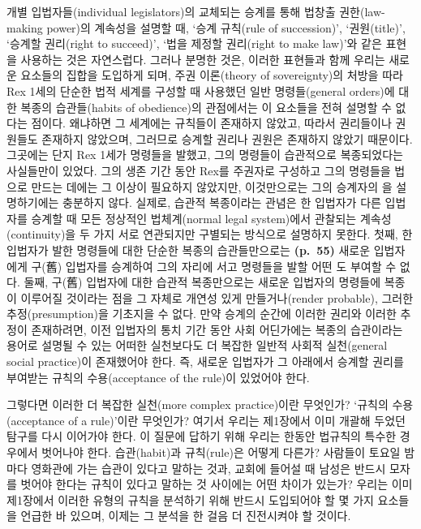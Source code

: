 개별 입법자들(individual legislators)의 교체되는 승계를 통해 법창출
권한(law-making power)의 계속성을 설명할 때, ‘승계 규칙(rule of
succession)’, ‘권원(title)’, ‘승계할 권리(right to succeed)’, ‘법을
제정할 권리(right to make law)’와 같은 표현을 사용하는 것은 자연스럽다.
그러나 분명한 것은, 이러한 표현들과 함께 우리는 새로운 요소들의 집합을
도입하게 되며, 주권 이론(theory of sovereignty)의 처방을 따라 Rex 1세의
단순한 법적 세계를 구성할 때 사용했던 일반 명령들(general orders)에 대한
복종의 습관들(habits of obedience)의 관점에서는 이 요소들을 전혀 설명할
수 없다는 점이다. 왜냐하면 그 세계에는 규칙들이 존재하지 않았고, 따라서
권리들이나 권원들도 존재하지 않았으며, 그러므로  승계할 권리나 권원은 존재하지 않았기 때문이다. 그곳에는 단지
Rex 1세가 명령들을 발했고, 그의 명령들이 습관적으로 복종되었다는
사실들만이 있었다. 그의 생존 기간 동안 Rex를 주권자로 구성하고 그의
명령들을 법으로 만드는 데에는 그 이상이 필요하지 않았지만, 이것만으로는
그의 승계자의 을 설명하기에는 충분하지 않다.
실제로, 습관적 복종이라는 관념은 한 입법자가 다른 입법자를 승계할 때
모든 정상적인 법체계(normal legal system)에서 관찰되는
계속성(continuity)을 두 가지 서로 연관되지만 구별되는 방식으로 설명하지
못한다. 첫째, 한 입법자가 발한 명령들에 대한 단순한 복종의
습관들만으로는 \textbf{(p.~55)} 새로운 입법자에게 구(舊) 입법자를
승계하여 그의 자리에 서고 명령들을 발할 어떤 도 부여할
수 없다. 둘째, 구(舊) 입법자에 대한 습관적 복종만으로는 새로운 입법자의
명령들에 복종이 이루어질 것이라는 점을 그 자체로 개연성 있게
만들거나(render probable), 그러한 추정(presumption)을 기초지을 수 없다.
만약 승계의 순간에 이러한 권리와 이러한 추정이 존재하려면, 이전 입법자의
통치 기간 동안 사회 어딘가에는 복종의 습관이라는 용어로 설명될 수 있는
어떠한 실천보다도 더 복잡한 일반적 사회적 실천(general social
practice)이 존재했어야 한다. 즉, 새로운 입법자가 그 아래에서 승계할
권리를 부여받는 규칙의 수용(acceptance of the rule)이 있었어야 한다.

그렇다면 이러한 더 복잡한 실천(more complex practice)이란 무엇인가?
‘규칙의 수용(acceptance of a rule)’이란 무엇인가? 여기서 우리는
제1장에서 이미 개괄해 두었던 탐구를 다시 이어가야 한다. 이 질문에 답하기
위해 우리는 한동안 법규칙의 특수한 경우에서 벗어나야 한다. 습관(habit)과
규칙(rule)은 어떻게 다른가? 사람들이 토요일 밤마다 영화관에 가는 습관이
있다고 말하는 것과, 교회에 들어설 때 남성은 반드시 모자를 벗어야 한다는
규칙이 있다고 말하는 것 사이에는 어떤 차이가 있는가? 우리는 이미
제1장에서 이러한 유형의 규칙을 분석하기 위해 반드시 도입되어야 할 몇
가지 요소들을 언급한 바 있으며, 이제는 그 분석을 한 걸음 더 진전시켜야
할 것이다.

